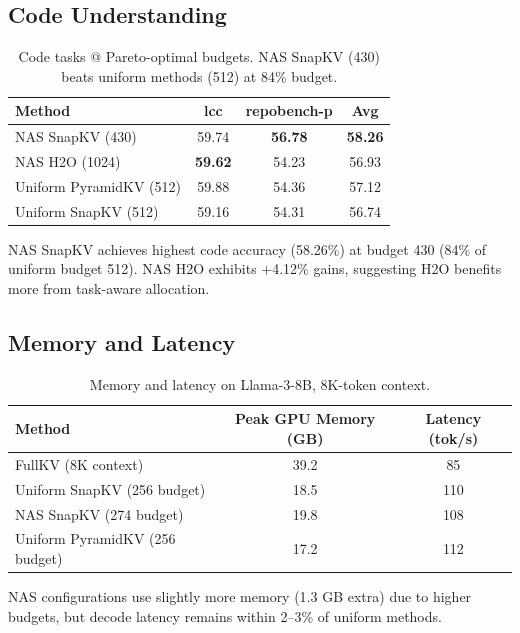 \documentclass[11pt,a4paper]{article}
\begin{document}
\subsection{Code Understanding}

\begin{table}[h]
\centering
\small
\begin{tabular}{l c c c}
\toprule
\textbf{Method} & \textbf{lcc} & \textbf{repobench-p} & \textbf{Avg} \\
\midrule
NAS SnapKV (430) & 59.74 & \textbf{56.78} & \textbf{58.26} \\
NAS H2O (1024) & \textbf{59.62} & 54.23 & 56.93 \\
Uniform PyramidKV (512) & 59.88 & 54.36 & 57.12 \\
Uniform SnapKV (512) & 59.16 & 54.31 & 56.74 \\
\bottomrule
\end{tabular}
\caption{Code tasks @ Pareto-optimal budgets. NAS SnapKV (430) beats uniform methods (512) at 84\% budget.}
\label{tab:code}
\end{table}

NAS SnapKV achieves highest code accuracy (58.26\%) at budget 430 (84\% of uniform budget 512). NAS H2O exhibits +4.12\% gains, suggesting H2O benefits more from task-aware allocation.

\subsection{Memory and Latency}

\begin{table}[h]
\centering
\small
\begin{tabular}{l c c}
\toprule
\textbf{Method} & \textbf{Peak GPU Memory (GB)} & \textbf{Latency (tok/s)} \\
\midrule
FullKV (8K context) & 39.2 & 85 \\
Uniform SnapKV (256 budget) & 18.5 & 110 \\
NAS SnapKV (274 budget) & 19.8 & 108 \\
Uniform PyramidKV (256 budget) & 17.2 & 112 \\
\bottomrule
\end{tabular}
\caption{Memory and latency on Llama-3-8B, 8K-token context.}
\label{tab:memory}
\end{table}

NAS configurations use slightly more memory (1.3 GB extra) due to higher budgets, but decode latency remains within 2–3\% of uniform methods.
\end{document}
